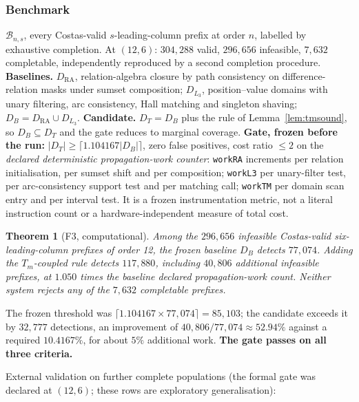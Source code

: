 \documentclass[11pt,a4paper]{article}
\newtheorem{theorem}{Theorem}[section]
\theoremstyle{definition}
\begin{document}
\subsubsection*{Benchmark}\noindent $\mathcal B_{n,s}$, every Costas-valid
$s$-leading-column prefix at order $n$, labelled by exhaustive completion. At
$(12,6)$: $304{,}288$ valid, $296{,}656$ infeasible, $7{,}632$ completable,
independently reproduced by a second completion procedure.
\textbf{Baselines.} $D_{\mathrm{RA}}$, relation-algebra closure by path
consistency on difference-relation masks under sumset composition; $D_{L_3}$,
position--value domains with unary filtering, arc consistency, Hall matching and
singleton shaving; $D_B=D_{\mathrm{RA}}\cup D_{L_3}$.
\textbf{Candidate.} $D_T=D_B$ plus the rule of Lemma~\ref{lem:tmsound}, so
$D_B\subseteq D_T$ and the gate reduces to marginal coverage.
\textbf{Gate, frozen before the run:} $|D_T|\ge\lceil1.104167|D_B|\rceil$, zero
false positives, cost ratio $\le2$ on the \emph{declared deterministic propagation-work
counter}: \texttt{workRA} increments per relation initialisation, per sumset
shift and per composition; \texttt{workL3} per unary-filter test, per
arc-consistency support test and per matching call; \texttt{workTM} per domain
scan entry and per interval test. It is a frozen instrumentation metric, not a
literal instruction count or a hardware-independent measure of total cost.

\begin{theorem}[F3, computational]
\label{thm:f3}
Among the $296{,}656$ infeasible Costas-valid six-leading-column prefixes of order
12, the frozen baseline $D_B$ detects $77{,}074$. Adding the $T_m$-coupled rule
detects $117{,}880$, including $40{,}806$ additional infeasible prefixes, at
$1.050$ times the baseline declared propagation-work count. Neither system
rejects any of the $7{,}632$ completable prefixes.
\end{theorem}

The frozen threshold was $\lceil1.104167\times77{,}074\rceil=85{,}103$; the
candidate exceeds it by $32{,}777$ detections, an improvement of
$40{,}806/77{,}074\approx52.94\%$ against a required $10.4167\%$, for about $5\%$
additional work. \textbf{The gate passes on all three criteria.}

\medskip\noindent External validation on further complete populations (the formal
gate was declared at $(12,6)$; these rows are exploratory generalisation):
\end{document}
